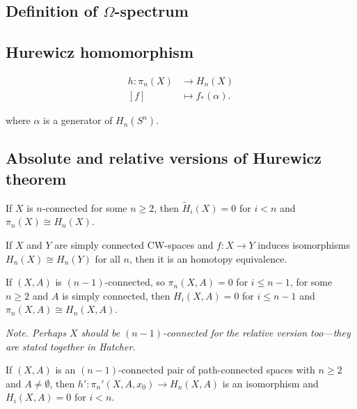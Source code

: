 \subsection{Definition of $\Omega$-spectrum}
\label{subsection-definition-of-spectrum}


\subsection{Hurewicz homomorphism}
\label{subsection-hurewicz-homomorphism}
\begin{definition}
\label{definition-hurewicz-homomorphism-2}
	$$
\begin{aligned}
		h: \pi_{n}(X) &\longrightarrow H_{n}(X) \\
		[f] &\longmapsto f_{*}(\alpha)
	.\end{aligned}
$$
\end{definition}
where $\alpha$ is a generator of $
H_{n}(S^{n})$.

\subsection{Absolute and relative versions of
Hurewicz theorem}
\label{subsection-absol-relat-versi-hurew}
\begin{theorem}[Hurewicz]
\label{theorem-hurewicz}
	If $X$ is $n$-connected for some $n\geq 2$,
	then $\tilde{H}_{i}(X)=0$ for $i<n$ and
	$\pi_{n}(X)\cong H_{n}(X)$.
\end{theorem}
\begin{lemma}
\label{lemma-if-x-y-simpl-conne-cw-space}
	If $X$ and $Y$ are simply connected
	CW-spaces and $f:X\to Y$ induces
	isomorphisms $H_{n}(X)\cong H_{n}(Y)$ for
	all $n$, then it is an homotopy equivalence.
\end{lemma}
\begin{theorem}
\label{theorem-relative-hurewicz}
	If $(X,A)$ is $(n-1)$-connected, so
	$\pi_{n}(X,A)=0$ for $i\leq n-1$, for some
	$n\geq 2$ and $A$ is simply connected, then
	$H_{i}(X,A)=0$ for $i\leq n-1$ and
	$\pi_{n}(X,A)\cong H_{n}(X,A)$.

	\textit{Note. Perhaps $X$ should be
	$(n-1)$-connected for the relative version
	too---they are stated together in Hatcher.}
\end{theorem}
\begin{theorem}
\label{theorem-relat-hurew-gener}
	If $(X,A)$ is an $(n-1)$-connected pair of
	path-connected spaces with $n\geq 2$ and
	$A\neq \emptyset $, then
	$h':\pi_{n}'(X,A,x_{0})\to H_{n}(X,A)$ is an
	isomorphism and $H_{i}(X,A)=0$ for $i<n$.
\end{theorem}



